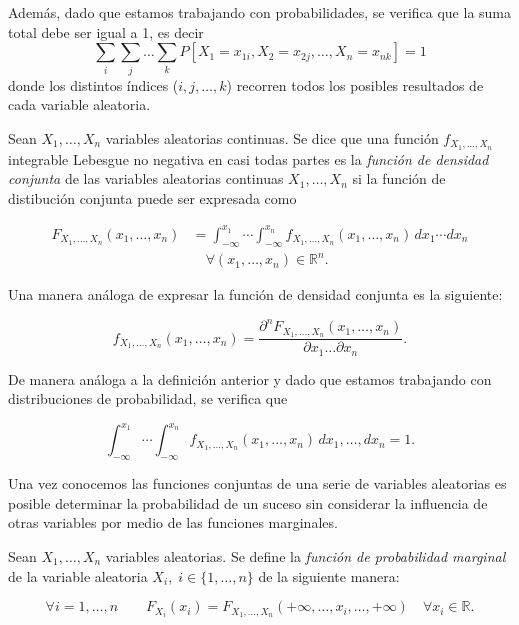 Además, dado que estamos trabajando con probabilidades, se verifica que la suma total debe ser igual a 1, es decir 
\[ \sum_{i}\sum_{j}\ldots\sum_{k}P[X_1=x_{1i}, X_2=x_{2j}, \ldots, X_n=x_{nk}] = 1 \] 
donde los distintos índices ($i, j, \ldots, k$) recorren todos los posibles resultados de cada variable aleatoria.\newline

\begin{definicion}
    Sean $X_1, \ldots, X_n$ variables aleatorias continuas. Se dice que una función $f_{X_{1}, \ldots, X_n}$ integrable Lebesgue no negativa en casi todas partes es la \emph{función de densidad conjunta} de las variables aleatorias continuas $X_1, \ldots, X_n$ si la función de distibución conjunta puede ser expresada como

    \begin{align*}
        F_{X_{1}, \ldots, X_{n}}(x_1, \ldots, x_n) &=  
        \int_{-\infty}^{x_1} \cdots \int_{-\infty}^{x_n} 
        f_{X_{1}, \ldots, X_n}(x_1, \ldots, x_n) \, dx_1 \cdots dx_n \\
        &\quad \forall(x_1, \ldots, x_n) \in \mathbb{R}^n.
    \end{align*}

    Una manera análoga de expresar la función de densidad conjunta es la siguiente:

    \[ f_{X_{1}, \ldots, X_n} (x_1, \ldots, x_n) = \frac{\partial^{n}F_{X_{1}, \ldots, X_{n}}(x_1, \ldots, x_n)}{\partial x_1 \ldots \partial x_n}. \]\newline
\end{definicion}

De manera análoga a la definición anterior y dado que estamos trabajando con distribuciones de probabilidad, se verifica que 

\[ \int_{-\infty}^{x_1} \cdots \int_{-\infty}^{x_n} f_{X_{1}, \ldots, X_n} (x_1, \ldots, x_n) \, dx_1, \ldots,  dx_n = 1. \]\newline


Una vez conocemos las funciones conjuntas de una serie de variables aleatorias es posible determinar la probabilidad de un suceso sin considerar la influencia de otras variables por medio de las funciones marginales.\newline

\begin{definicion}
    Sean $X_1, \ldots, X_n$ variables aleatorias. Se define la \emph{función de probabilidad marginal} de la variable aleatoria $X_i, \; i \in \{1, \ldots, n\}$ de la siguiente manera:

    \[ \forall i = 1,\ldots,n  \qquad F_{X_i}(x_i) = F_{X_{1}, \ldots, X_{n}}(+\infty, \ldots,x_i, \ldots,+\infty) \quad \forall x_i \in \mathbb{R}. \]\newline
\end{definicion}

